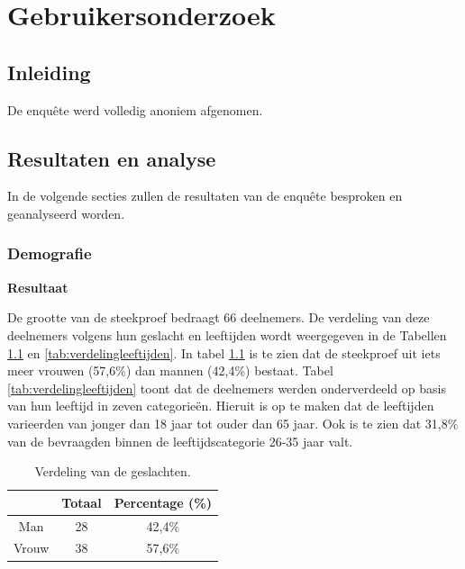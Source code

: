 
\chapter{Gebruikersonderzoek}
\label{ch:gebruikersonderzoek}

\section{Inleiding}

De enquête werd volledig anoniem afgenomen.


\section{Resultaten en analyse}

In de volgende secties zullen de resultaten van de enquête besproken en geanalyseerd worden.

\subsection{Demografie}

\textbf{Resultaat}

De grootte van de steekproef bedraagt 66 deelnemers. De verdeling van deze deelnemers volgens hun geslacht en leeftijden wordt weergegeven in de Tabellen \ref{tab:verdelinggeslacht} en \ref{tab:verdelingleeftijden}. In tabel \ref{tab:verdelinggeslacht} is te zien dat de steekproef uit iets meer vrouwen (57,6\%) dan mannen (42,4\%) bestaat. Tabel \ref{tab:verdelingleeftijden} toont dat de deelnemers werden onderverdeeld op basis van hun leeftijd in zeven categorieën. Hieruit is op te maken dat de leeftijden varieerden van jonger dan 18 jaar tot ouder dan 65 jaar. Ook is te zien dat 31,8\% van de bevraagden binnen de leeftijdscategorie 26-35 jaar valt.

\begin{table}
\begin{center}
    \begin{tabular}{c|c|c}
        & \textbf{Totaal} & \textbf{Percentage} (\%) \\
        \hline
        Man & 28 & 42,4\% \\
        \hline
        Vrouw & 38 & 57,6\% \\
    \end{tabular}
\end{center}
\caption{Verdeling van de geslachten.}
\label{tab:verdelinggeslacht}
\end{table}

